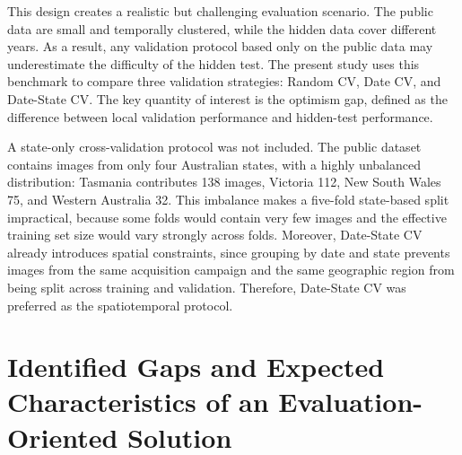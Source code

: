 This design creates a realistic but challenging evaluation scenario. The public data are small and temporally clustered, while the hidden data cover different years. As a result, any validation protocol based only on the public data may underestimate the difficulty of the hidden test. The present study uses this benchmark to compare three validation strategies: Random CV, Date CV, and Date-State CV. The key quantity of interest is the optimism gap, defined as the difference between local validation performance and hidden-test performance.

A state-only cross-validation protocol was not included. The public dataset contains images from only four Australian states, with a highly unbalanced distribution: Tasmania contributes 138 images, Victoria 112, New South Wales 75, and Western Australia 32. This imbalance makes a five-fold state-based split impractical, because some folds would contain very few images and the effective training set size would vary strongly across folds. Moreover, Date-State CV already introduces spatial constraints, since grouping by date and state prevents images from the same acquisition campaign and the same geographic region from being split across training and validation. Therefore, Date-State CV was preferred as the spatiotemporal protocol.

\section{Identified Gaps and Expected Characteristics of an Evaluation-Oriented Solution}

